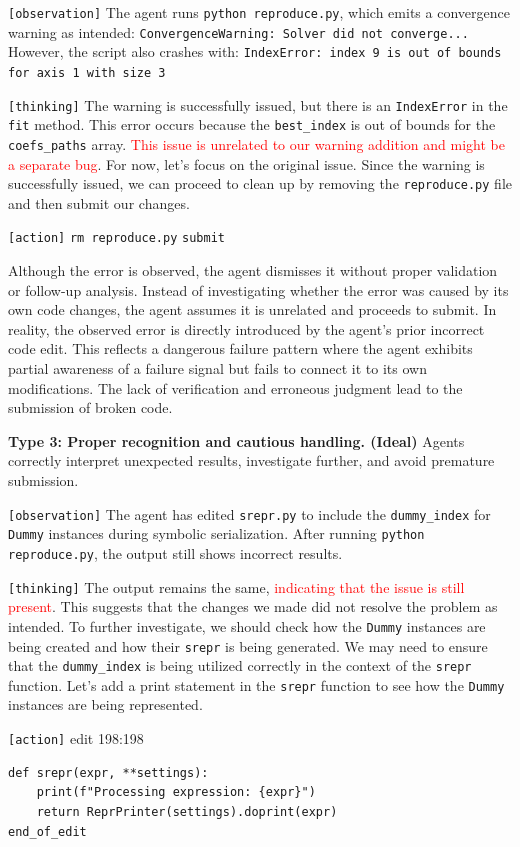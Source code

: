 \begin{borderlinebox}
\texttt{[observation]}  
The agent runs \texttt{python reproduce.py}, which emits a convergence warning as intended:  
\texttt{ConvergenceWarning: Solver did not converge...}  
However, the script also crashes with:  
\texttt{IndexError: index 9 is out of bounds for axis 1 with size 3}  

\texttt{[thinking]}  
The warning is successfully issued, but there is an \texttt{IndexError} in the \texttt{fit} method. This error occurs because the \texttt{best\_index} is out of bounds for the \texttt{coefs\_paths} array. \textcolor{red}{This issue is unrelated to our warning addition and might be a separate bug}. For now, let's focus on the original issue. Since the warning is successfully issued, we can proceed to clean up by removing the \texttt{reproduce.py} file and then submit our changes.  

\texttt{[action]}  
\texttt{rm reproduce.py}  
\texttt{submit}
\end{borderlinebox}


Although the error is observed, the agent dismisses it without proper validation or follow-up analysis. Instead of investigating whether the error was caused by its own code changes, the agent assumes it is unrelated and proceeds to submit. In reality, the observed error is directly introduced by the agent's prior incorrect code edit. This reflects a dangerous failure pattern where the agent exhibits partial awareness of a failure signal but fails to connect it to its own modifications. The lack of verification and erroneous judgment lead to the submission of broken code.


\textbf{Type 3: Proper recognition and cautious handling. (Ideal)}
Agents correctly interpret unexpected results, investigate further, and avoid premature submission.

\begin{correctbox}
\texttt{[observation]}  
The agent has edited \texttt{srepr.py} to include the \texttt{dummy\_index} for \texttt{Dummy} instances during symbolic serialization. After running \texttt{python reproduce.py}, the output still shows incorrect results.

\texttt{[thinking]}  
The output remains the same, \textcolor{red}{indicating that the issue is still present}. This suggests that the changes we made did not resolve the problem as intended.  
To further investigate, we should check how the \texttt{Dummy} instances are being created and how their \texttt{srepr} is being generated. We may need to ensure that the \texttt{dummy\_index} is being utilized correctly in the context of the \texttt{srepr} function.  
Let's add a print statement in the \texttt{srepr} function to see how the \texttt{Dummy} instances are being represented.

\texttt{[action]} edit 198:198
\begin{verbatim}
def srepr(expr, **settings):
    print(f"Processing expression: {expr}")
    return ReprPrinter(settings).doprint(expr)  
end_of_edit
\end{verbatim}
\end{correctbox}

